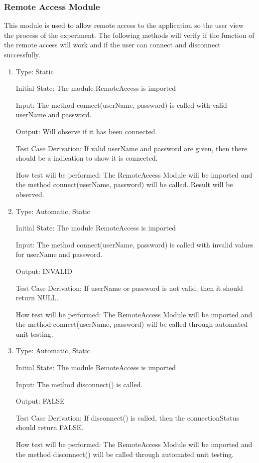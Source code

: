 \documentclass[12pt, titlepage]{article}
\begin{document}
\subsubsection{Remote Access Module}

This module is used to allow remote access to the application so the user view the process of the experiment. The following methods will verify if the function of the remote 
access will work and if the user can connect and disconnect successfully.
\begin{enumerate}[{UT-RA}1.]

  \item

  Type: Static
            
  Initial State: The module RemoteAccess is imported
            
  Input: The method connect(userName, password) is called with valid userName and password.
            
  Output: Will observe if it has been connected.
  
  Test Case Derivation: If  valid userName and password are given, then there should be a indication to show it is connected.
  
  
  How test will be performed: The RemoteAccess Module will be imported and the method connect(userName, password) will be called. Result will be observed.

  \item

  Type: Automatic, Static
            
  Initial State: The module RemoteAccess is imported
            
  Input: The method connect(userName, password) is called with invalid values for userName and password.
            
  Output: INVALID
  
  Test Case Derivation: If userName or password is not valid, then it should return NULL.
  
  
  How test will be performed: The RemoteAccess Module will be imported and the method connect(userName, password) will be called through
  automated unit testing.

  \item

  Type: Automatic, Static
            
  Initial State: The module RemoteAccess is imported
            
  Input: The method disconnect() is called.
            
  Output: FALSE
  
  Test Case Derivation: If disconnect() is called, then the connectionStatus should return FALSE.
  
  
  How test will be performed: The RemoteAccess Module will be imported and the method disconnect() will be called through
  automated unit testing.

\end{enumerate}
\end{document}
